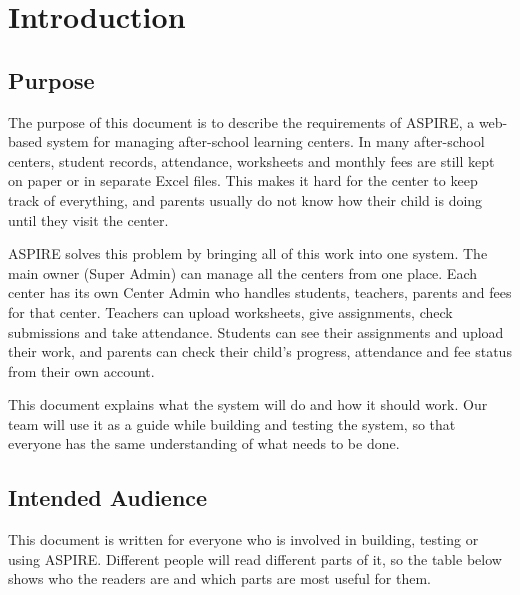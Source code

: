 \chapter{Introduction}\label{ch:intro}

\section{Purpose}\label{sec:purpose}

The purpose of this document is to describe the requirements of ASPIRE, a web-based
system for managing after-school learning centers. In many after-school centers,
student records, attendance, worksheets and monthly fees are still kept on paper or
in separate Excel files. This makes it hard for the center to keep track of
everything, and parents usually do not know how their child is doing until they
visit the center.

ASPIRE solves this problem by bringing all of this work into one system. The main
owner (Super Admin) can manage all the centers from one place. Each center has its
own Center Admin who handles students, teachers, parents and fees for that center.
Teachers can upload worksheets, give assignments, check submissions and take
attendance. Students can see their assignments and upload their work, and parents
can check their child's progress, attendance and fee status from their own account.

This document explains what the system will do and how it should work. Our team
will use it as a guide while building and testing the system, so that everyone
has the same understanding of what needs to be done.

\section{Intended Audience}\label{sec:audience}

This document is written for everyone who is involved in building, testing or
using ASPIRE. Different people will read different parts of it, so the table
below shows who the readers are and which parts are most useful for them.

